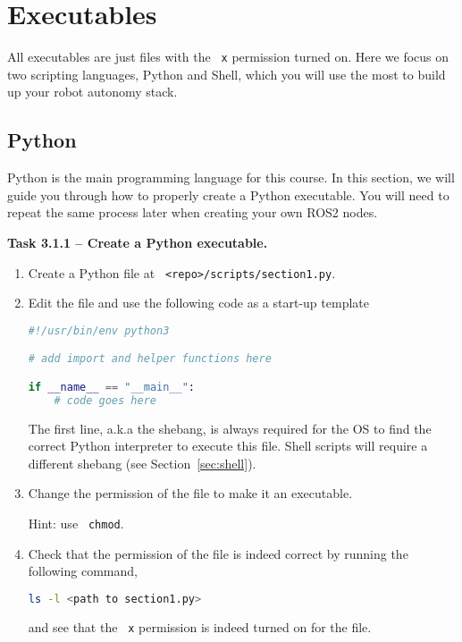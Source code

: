 \documentclass{article}
\def\code#1{\texttt{\color{magenta} #1}}
\begin{document}
\section{Executables}
All executables are just files with the \code{x} permission turned on. Here
we focus on two scripting languages, Python and Shell, which you will use the most
to build up your robot autonomy stack.

\subsection{Python}
Python is the main programming language for this course. In this section, we will
guide you through how to properly create a Python executable. You will need to repeat
the same process later when creating your own ROS2 nodes.

{\bf Task 3.1.1 -- Create a Python executable.}

\begin{enumerate}
\item Create a Python file at \code{<repo>/scripts/section1.py}.

\item Edit the file and use the following code as a start-up template
\begin{lstlisting}[language=Python]
#!/usr/bin/env python3

# add import and helper functions here

if __name__ == "__main__":
    # code goes here
\end{lstlisting}

The first line, a.k.a the shebang, is always required for the OS to find the correct
Python interpreter to execute this file. Shell scripts will require a different
shebang (see Section~\ref{sec:shell}).

\item Change the permission of the file to make it an executable.

    Hint: use \code{chmod}.

\item Check that the permission of the file is indeed correct by running the following command,
\begin{lstlisting}[language=sh, numbers=none]
ls -l <path to section1.py>
\end{lstlisting}
and see that the \code{x} permission is indeed turned on for the file.

\end{enumerate}
\end{document}
